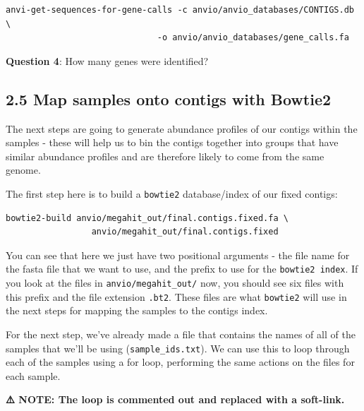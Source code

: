 \documentclass[
]{book}
\begin{document}
\begin{verbatim}
anvi-get-sequences-for-gene-calls -c anvio/anvio_databases/CONTIGS.db \
                              -o anvio/anvio_databases/gene_calls.fa
\end{verbatim}

\textbf{Question 4}: How many genes were identified?

\subsection{2.5 Map samples onto contigs with Bowtie2}\label{map-samples-onto-contigs-with-bowtie2}

The next steps are going to generate abundance profiles of our contigs within the samples - these will help us to bin the contigs together into groups that have similar abundance profiles and are therefore likely to come from the same genome.

The first step here is to build a \texttt{bowtie2} database/index of our fixed contigs:

\begin{verbatim}
bowtie2-build anvio/megahit_out/final.contigs.fixed.fa \
                 anvio/megahit_out/final.contigs.fixed
\end{verbatim}

You can see that here we just have two positional arguments - the file name for the fasta file that we want to use, and the prefix to use for the \texttt{bowtie2\ index}. If you look at the files in \texttt{anvio/megahit\_out/} now, you should see six files with this prefix and the file extension \texttt{.bt2}. These files are what \texttt{bowtie2} will use in the next steps for mapping the samples to the contigs index.

For the next step, we've already made a file that contains the names of all of the samples that we'll be using (\texttt{sample\_ids.txt}). We can use this to loop through each of the samples using a for loop, performing the same actions on the files for each sample.

\textbf{⚠️ NOTE: The loop is commented out and replaced with a soft-link.}
\end{document}

